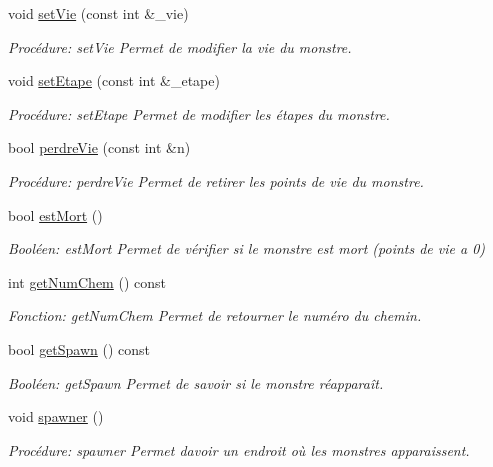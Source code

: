 \begin{DoxyCompactItemize}
void \hyperlink{classMonstre_ad26a170300007ea8c78348a29123de5c}{set\+Vie} (const int \&\+\_\+vie)
\begin{DoxyCompactList}\small\item\em Procédure\+: set\+Vie Permet de modifier la vie du monstre. \end{DoxyCompactList}\item 
void \hyperlink{classMonstre_a51895539b2db4bd6e267e0ac5a1729ce}{set\+Etape} (const int \&\+\_\+etape)
\begin{DoxyCompactList}\small\item\em Procédure\+: set\+Etape Permet de modifier les étapes du monstre. \end{DoxyCompactList}\item 
bool \hyperlink{classMonstre_af6d0a1f276465d12d50db387855e62d3}{perdre\+Vie} (const int \&n)
\begin{DoxyCompactList}\small\item\em Procédure\+: perdre\+Vie Permet de retirer les points de vie du monstre. \end{DoxyCompactList}\item 
bool \hyperlink{classMonstre_aebc60bc5dfa1353663ba975c589dc2e3}{est\+Mort} ()
\begin{DoxyCompactList}\small\item\em Booléen\+: est\+Mort Permet de vérifier si le monstre est mort (points de vie a 0) \end{DoxyCompactList}\item 
int \hyperlink{classMonstre_ac7998eae7604e8bbfb9aad3b3ea59c33}{get\+Num\+Chem} () const
\begin{DoxyCompactList}\small\item\em Fonction\+: get\+Num\+Chem Permet de retourner le numéro du chemin. \end{DoxyCompactList}\item 
bool \hyperlink{classMonstre_a810f2e49356248d02f7b0e9b8ea16d85}{get\+Spawn} () const
\begin{DoxyCompactList}\small\item\em Booléen\+: get\+Spawn Permet de savoir si le monstre réapparaît. \end{DoxyCompactList}\item 
void \hyperlink{classMonstre_a26db17b29af1a99278e7d21bc91f1532}{spawner} ()
\begin{DoxyCompactList}\small\item\em Procédure\+: spawner Permet d\textquotesingle{}avoir un endroit où les monstres apparaissent. \end{DoxyCompactList}\item 

\end{DoxyCompactItemize}
